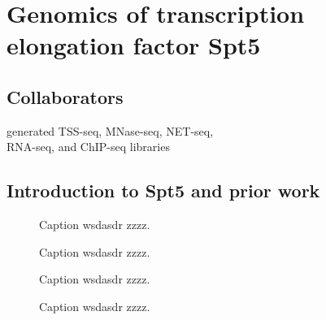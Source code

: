 \chapter{Genomics of transcription elongation factor Spt5}

\section{Collaborators}

\begin{description}[align=right, leftmargin=!, labelwidth=5cm, noitemsep]
    \item [Ameet Shetty] generated TSS-seq, MNase-seq, NET-seq,\\RNA-seq, and ChIP-seq libraries
\end{description}

\section{Introduction to Spt5 and prior work}

\begin{figure}
    \caption[Diagram of the dual-shutoff system used to deplete Spt5 from \textit{S. pombe}]{Caption wsdasdr zzzz.}
\end{figure}

\begin{figure}
\caption[Average Spt5 ChIP-seq, RNAPII ChIP-seq, and sense NET-seq signal over non-overlapping coding genes, from Spt5 depleted and non-depleted cells.]{Caption wsdasdr zzzz.}
\end{figure}

\begin{figure}
\caption[Enrichment of RNAPII phospho-serine 5 and phospho-serine 2 over non-overlapping coding genes, in Spt5 depleted and non-depleted cells.]{Caption wsdasdr zzzz.}
\end{figure}

\begin{figure}
\caption[Heatmaps of antisense RNA-seq signal from Spt5 depleted and non-depleted cells, over non-overlapping coding genes.]{Caption wsdasdr zzzz.}
\end{figure}

